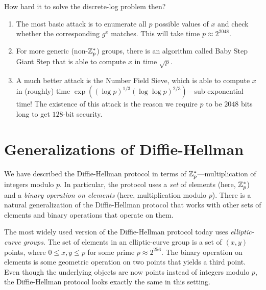 How hard it to solve the discrete-log problem then?
\begin{enumerate}
	\item The most basic attack is to enumerate all $p$ possible values of $x$ and check whether the corresponding $g^x$ matches. This will take time $p \approx 2^{2048}$.
	\item For more generic (non-$\mathbb{Z}_p^*$) groups, there is an algorithm called Baby Step Giant Step that is able to compute $x$ in time $\sqrt{p}$.
  \item A much better attack is the Number Field Sieve, which is able to compute $x$ in (roughly) time $\exp((\log p)^{1/3} (\log \log p)^{2/3})$---sub-exponential time!
    The existence of this attack is the reason we require $p$ to be $2048$ bits long to 
    get $128$-bit security.
\end{enumerate}






\section{Generalizations of Diffie-Hellman}

We have described the Diffie-Hellman protocol in terms
of $\mathbb{Z}^*_p$---multiplication of integers modulo $p$.
In particular, the protocol uses a \emph{set} of elements (here, $\mathbb{Z}^*_p$)
and a \emph{binary operation on elements} (here, multiplication modulo $p$).
There is a natural generalization of the Diffie-Hellman
protocol that works with other sets of elements and
binary operations that operate on them.

The most widely used version of the Diffie-Hellman protocol today
uses \emph{elliptic-curve groups}.
The set of elements in an elliptic-curve group is a set of $(x,y)$
points, where $0 \leq x, y \leq p$ for some prime $p \approx 2^{256}$.
The binary operation on elements is some geometric operation
on two points that yields a third point.
Even though the underlying objects are now points instead of integers
modulo $p$, the Diffie-Hellman protocol looks exactly the same in this setting.

